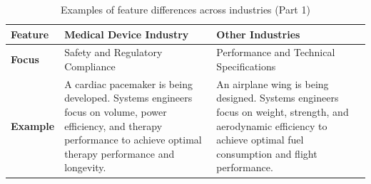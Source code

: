 \documentclass[conference]{IEEEtran}
\begin{document}
    \begin{table}[t]
    \caption{Examples of feature differences across industries (Part 1)}
    \label{tab:industry_features_part1}
    \centering
    \begin{tabular}{|p{2.5cm}|p{6.5cm}|p{6.5cm}|}
    \hline
    \textbf{Feature}         & \textbf{Medical Device Industry}                                                                                                                                                                                                                                                                                                                                                                               & \textbf{Other Industries}                                                                                                                                                                                                                                                                                                                                                                                                                                   \\ \hline
    \textbf{Focus}           & Safety and Regulatory Compliance                                                                                                                                                                                                                                                                                                                                                                               & Performance and Technical Specifications                                                                                                                                                                                                                                                                                                                                                                                                                    \\ \hline
    \textbf{Example}         & A cardiac pacemaker is being developed. Systems engineers focus on volume, power efficiency, and therapy performance to achieve optimal therapy performance and longevity.                                                                                                                                                                                                                                     & An airplane wing is being designed. Systems engineers focus on weight, strength, and aerodynamic efficiency to achieve optimal fuel consumption and flight performance.                                                                                                                                                                                                                                                                                     \\ \hline

\end{tabular}
\end{table}
\end{document}
